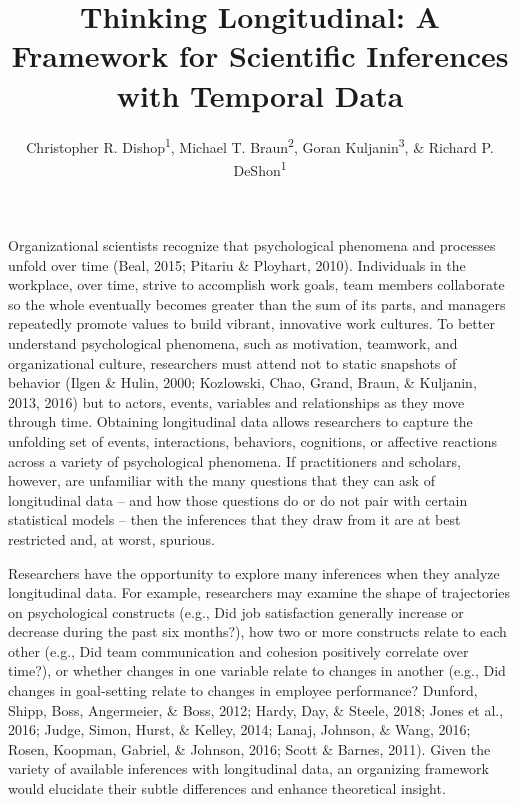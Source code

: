 \documentclass[english,,man]{apa6}
\title{Thinking Longitudinal: A Framework for Scientific Inferences with Temporal Data}
\author{Christopher R. Dishop\textsuperscript{1}, Michael T. Braun\textsuperscript{2}, Goran Kuljanin\textsuperscript{3}, \& Richard P. DeShon\textsuperscript{1}}
\date{}
\affiliation{
\vspace{0.5cm}
\textsuperscript{1} Michigan State University\\\textsuperscript{2} University of South Florida\\\textsuperscript{3} DePaul University}
\begin{document}
\maketitle

Organizational scientists recognize that psychological phenomena and processes unfold over time (Beal, 2015; Pitariu \& Ployhart, 2010). Individuals in the workplace, over time, strive to accomplish work goals, team members collaborate so the whole eventually becomes greater than the sum of its parts, and managers repeatedly promote values to build vibrant, innovative work cultures. To better understand psychological phenomena, such as motivation, teamwork, and organizational culture, researchers must attend not to static snapshots of behavior (Ilgen \& Hulin, 2000; Kozlowski, Chao, Grand, Braun, \& Kuljanin, 2013, 2016) but to actors, events, variables and relationships as they move through time. Obtaining longitudinal data allows researchers to capture the unfolding set of events, interactions, behaviors, cognitions, or affective reactions across a variety of psychological phenomena. If practitioners and scholars, however, are unfamiliar with the many questions that they can ask of longitudinal data -- and how those questions do or do not pair with certain statistical models -- then the inferences that they draw from it are at best restricted and, at worst, spurious.

Researchers have the opportunity to explore many inferences when they analyze longitudinal data. For example, researchers may examine the shape of trajectories on psychological constructs (e.g., Did job satisfaction generally increase or decrease during the past six months?), how two or more constructs relate to each other (e.g., Did team communication and cohesion positively correlate over time?), or whether changes in one variable relate to changes in another (e.g., Did changes in goal-setting relate to changes in employee performance? Dunford, Shipp, Boss, Angermeier, \& Boss, 2012; Hardy, Day, \& Steele, 2018; Jones et al., 2016; Judge, Simon, Hurst, \& Kelley, 2014; Lanaj, Johnson, \& Wang, 2016; Rosen, Koopman, Gabriel, \& Johnson, 2016; Scott \& Barnes, 2011). Given the variety of available inferences with longitudinal data, an organizing framework would elucidate their subtle differences and enhance theoretical insight.
\end{document}
